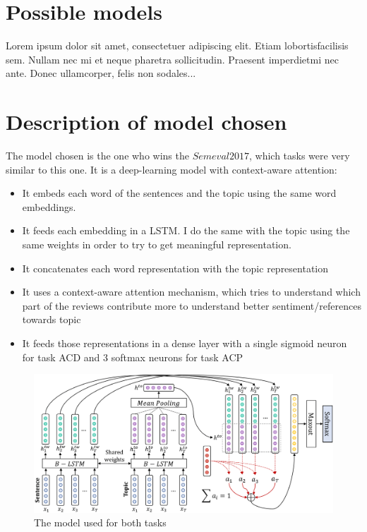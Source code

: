 \documentclass{article}
\begin{document}
    \section{Possible models}\label{sec:s2}
        Lorem  ipsum  dolor  sit  amet,  consectetuer  adipiscing
        elit.   Etiam  lobortisfacilisis sem.  Nullam nec mi et
        neque pharetra sollicitudin.  Praesent imperdietmi nec ante.
        Donec ullamcorper, felis non sodales...

    \section{Description of model chosen}\label{sec:s3}
        The model chosen is the one who wins the $Semeval2017$, which tasks were very similar to this one.
        It is a deep-learning model with context-aware attention:
        \begin{itemize}
            \item It embeds each word of the sentences and the topic using the same word embeddings.
            \item It feeds each embedding in a LSTM. I do the same with the topic using the same weights in order to try to get meaningful representation.
            \item It concatenates each word representation with the topic representation
            \item It uses a context-aware attention mechanism, which tries to understand which part of the reviews contribute more to understand better sentiment/references towards topic
            \item It feeds those representations in a dense layer with a single sigmoid neuron for task ACD and 3 softmax neurons for task ACP
        \end{itemize}
        \begin{figure}
            \includegraphics[width=\linewidth]{model.png}
            \caption{The model used for both tasks}
            \label{fig:model}
        \end{figure}
\end{document}
